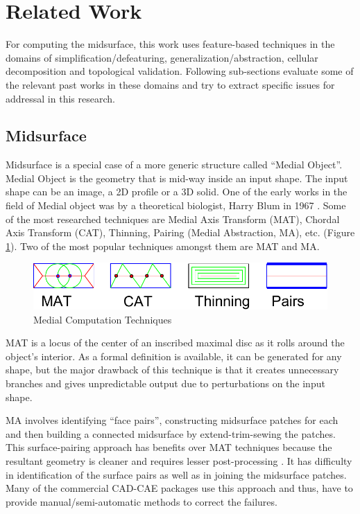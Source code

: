 
\section{Related Work}	

 For computing the midsurface, this work uses feature-based techniques in the domains of simplification/defeaturing, generalization/abstraction, cellular decomposition and topological validation. Following sub-sections evaluate some of the relevant past works in these domains and try to extract specific issues for addressal in this research.
 
 \subsection{Midsurface}
 
Midsurface is a special case of a more generic structure called ``Medial Object''. Medial Object is the geometry that is mid-way inside an input shape. The input shape can be an image, a 2D profile or a 3D solid. One of the early works in the field of Medial object was by a theoretical biologist, Harry Blum in 1967 \cite{Harry1967}. Some of the most researched techniques are  Medial Axis Transform (MAT), Chordal Axis Transform (CAT), Thinning, Pairing (Medial Abstraction, MA), etc. (Figure \ref{fig:medials}). Two of the most popular techniques amongst them  are MAT and MA. 

	\begin{figure} [!h]
		\centering
		\includegraphics[width=0.6\linewidth]{..//Common/images/MedialMethodsOnlyShort.pdf}
		\caption{Medial Computation Techniques}
		\label{fig:medials}
	\end{figure}



MAT is a locus of the center of an inscribed maximal disc as it rolls around the object's interior. As a formal definition is available, it can be generated for any shape, but the major drawback of this technique is that it creates unnecessary branches and gives unpredictable output due to perturbations on the input shape.

MA involves identifying ``face pairs'', constructing midsurface patches for each and then building a connected midsurface by extend-trim-sewing the patches. This surface-pairing approach has benefits over MAT techniques because the resultant geometry is cleaner and requires lesser post-processing \cite{Lockett2008}. It has difficulty in identification of the surface pairs as well as in joining the midsurface patches. Many of the commercial CAD-CAE packages use this approach and thus, have to provide manual/semi-automatic methods to correct the failures.


